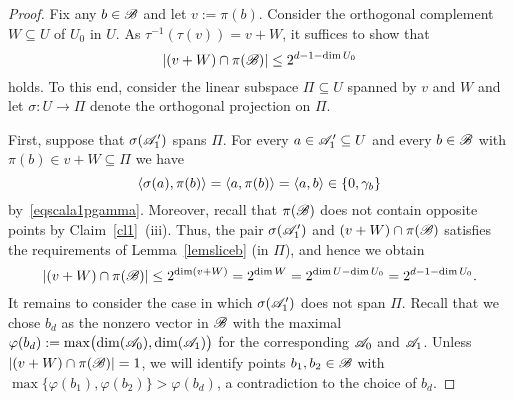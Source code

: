 \claimpreimagestau*
\begin{proof}
    Fix any $b \in {\mathscr{B}}$ and let $v := \pi(b)$.
    Consider the orthogonal complement $W \subseteq U$ of $U_0$ in $U$.
    As $\tau^{-1}(\tau(v)) %
    = v + W %
    $, it suffices to show that
    \[
        |(v + W) \cap \pi({\mathscr{B}})| \le 2^{d - 1 - \dim U_0}
    \]
    holds.
    To this end, consider the linear subspace $\Pi \subseteq U$ spanned by $v$ and $W$ and let $\sigma : U \to \Pi$ denote the orthogonal projection on $\Pi$.
    
    First, suppose that $\sigma({\mathscr{A}}_1')$ spans $\Pi$.
    For every $a \in {\mathscr{A}}_1' \subseteq U$ and every $b \in {\mathscr{B}}$ with $\pi(b) \in v + W \subseteq \Pi $ we have
    \[
        \langle \sigma(a), \pi(b)\rangle = \langle a,\pi(b)\rangle = \langle a,b\rangle \in \{0,\gamma_b\}
    \]
    by~\eqref{eqscala1pgamma}.
    Moreover, recall that $\pi({\mathscr{B}})$ does not contain opposite points by Claim~\ref{cl1}~(iii).
    Thus, the pair $\sigma({\mathscr{A}}_1')$ and $(v + W) \cap \pi({\mathscr{B}})$ satisfies the requirements of Lemma~\ref{lemsliceb} (in $\Pi$), and hence we obtain
    \[
        |(v + W) \cap \pi({\mathscr{B}})| \le 2^{\dim(v + W)} = 2^{\dim W} = 2^{\dim U - \dim U_0} = 2^{d - 1 - \dim U_0}.
    \]
    It remains to consider the case in which $\sigma({\mathscr{A}}_1')$ does not span $\Pi$. Recall that we chose $b_d$ as the nonzero vector in ${\mathscr{B}}$ with the maximal $\varphi(b_d):=\max\bigl(\operatorname{dim}({\mathscr{A}}_0), \operatorname{dim}({\mathscr{A}}_1)\bigr)$ for the corresponding ${\mathscr{A}}_0$ and ${\mathscr{A}}_1$. 
    Unless $|(v + W) \cap \pi({\mathscr{B}})| = 1$, we will identify points $b_1,b_2 \in {\mathscr{B}}$ with $\max \{ \varphi(b_1),\varphi(b_2) \} > \varphi(b_d)$, a contradiction to the choice of $b_d$.


\end{proof}
